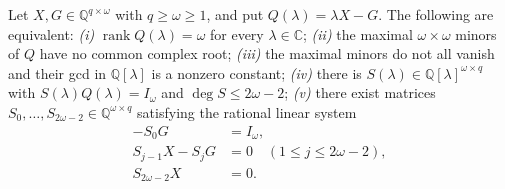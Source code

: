 \begin{lem}\label{lem:zero}
Let $X,G\in\mathbb Q^{q\times\omega}$ with $q\ge\omega\ge1$, and put
$Q(\lambda)=\lambda X-G$. The following are equivalent:
\emph{(i)} $\operatorname{rank}Q(\lambda)=\omega$ for every
$\lambda\in\mathbb C$;
\emph{(ii)} the maximal $\omega\times\omega$ minors of $Q$ have no common
complex root;
\emph{(iii)} the maximal minors do not all vanish and their gcd in
$\mathbb Q[\lambda]$ is a nonzero constant;
\emph{(iv)} there is $S(\lambda)\in\mathbb Q[\lambda]^{\omega\times q}$ with
$S(\lambda)Q(\lambda)=I_\omega$ and $\deg S\le2\omega-2$;
\emph{(v)} there exist matrices
$S_0,\dots,S_{2\omega-2}\in\mathbb Q^{\omega\times q}$ satisfying the rational
linear system
\begin{equation}
\tag{R0}\label{eq:R0}
\begin{aligned}
-S_0G&=I_\omega,\\
S_{j-1}X-S_jG&=0\quad(1\le j\le2\omega-2),\\
S_{2\omega-2}X&=0 .
\end{aligned}
\end{equation}
\end{lem}

